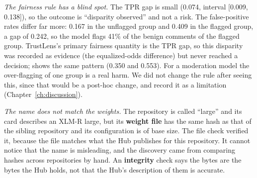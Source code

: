 \emph{The fairness rule has a blind spot.} The TPR gap is small (0.074, interval [0.009, 0.138]), so the outcome is ``disparity observed'' and not a risk. The false-positive rates differ far more: 0.167 in the unflagged group and 0.409 in the flagged group, a gap of 0.242, so the model flags 41\% of the benign comments of the flagged group. TrustLens's primary fairness quantity is the TPR gap, so this disparity was recorded as evidence (the equalized-odds difference) but never reached a decision;  shows the same pattern (0.350 and 0.553). For a moderation model the over-flagging of one group is a real harm. We did not change the rule after seeing this, since that would be a post-hoc change, and record it as a limitation (Chapter~\ref{ch:discussion}).

\emph{The name does not match the weights.} The repository is called ``large'' and its card describes an XLM-R large, but its \textbf{weight file} has the same hash as that of the sibling repository  and its configuration is of base size. The file check verified it, because the file matches what the Hub publishes for this repository. It cannot notice that the name is misleading, and the discovery came from comparing hashes across repositories by hand. An \textbf{integrity} check says the bytes are the bytes the Hub holds, not that the Hub's description of them is accurate.
